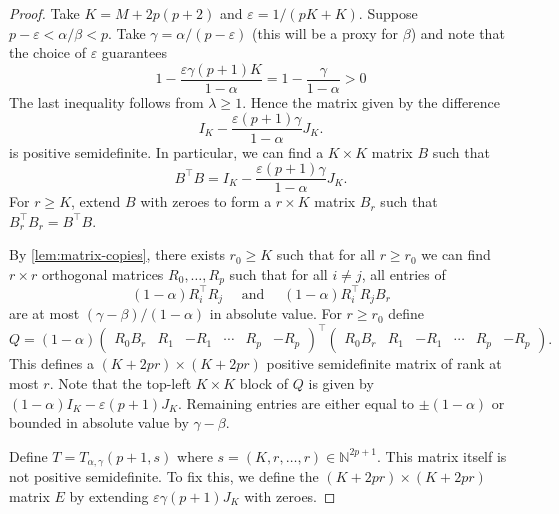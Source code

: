 \documentclass[reqno, 11pt]{amsart}
\theoremstyle{definition}
\theoremstyle{remark}
\newcommand{\NN}{\mathbb{N}}
\begin{document}
\begin{proof}
    Take $K = M + 2p(p+2)$ and $\varepsilon = 1/(pK + K)$. Suppose $p-\varepsilon < \alpha/\beta < p$. Take $\gamma = \alpha/(p-\varepsilon)$ (this will be a proxy for $\beta$) and note that the choice of $\varepsilon$ guarantees 
    \[
      1 - \frac{\varepsilon \gamma (p+1) K}{1-\alpha} = 1 - \frac{\gamma}{1-\alpha} > 0
    \]
    The last inequality follows from $\lambda \geq 1$. Hence the matrix given by the difference 
    \[
        I_{K}- \frac{\varepsilon (p+1) \gamma}{1-\alpha} J_{K}.
    \]
    is positive semidefinite. In particular, we can find a $K \times K$ matrix $B$ such that
    \[
        B^\intercal B = I_{K}- \frac{\varepsilon (p+1) \gamma}{1-\alpha} J_{K}.
    \]
    For $r \geq K$, extend $B$ with zeroes to form a $r \times K$ matrix $B_r$ such that $B_r^\intercal B_r = B^\intercal B$.
    
    By \cref{lem:matrix-copies}, there exists $r_0 \geq K$ such that for all $r \geq r_0$ we can find $r \times r$ orthogonal matrices $R_0, \ldots, R_{p}$ such that for all $i \neq j$, all entries of
    \[
        (1-\alpha)R_i^\intercal R_j \quad \text{ and } \quad (1-\alpha)R_i^\intercal R_jB_r
    \]
    are at most $(\gamma - \beta)/(1-\alpha)$ in absolute value. For $r \geq r_0$ define
    \[
    Q = (1-\alpha) \begin{pmatrix}
					 R_{0}B_r & R_1 & -R_1 & \cdots & R_p & -R_p
			      \end{pmatrix}^\intercal
                    \begin{pmatrix}
					R_{0}B_r & R_1 & -R_1 & \cdots & R_p & -R_p 
			      \end{pmatrix}.
    \]
This defines a $(K + 2pr) \times (K + 2pr)$ positive semidefinite matrix of rank at most $r$. Note that the top-left  $K \times K$ block of $Q$ is given by $ (1-\alpha)I_{K} - \varepsilon (p+1) J_{K}$. Remaining entries are either equal to $\pm(1-\alpha)$ or bounded in absolute value by $\gamma - \beta$.
    
Define $T = T_{\alpha, \gamma}(p+1, s)$ where $s = (K, r, \ldots, r) \in \NN^{2p+1}$. This matrix itself is not positive semidefinite. To fix this, we define the $(K + 2pr) \times (K + 2pr)$ matrix $E$ by extending $\varepsilon \gamma(p+1) J_{K}$ with zeroes.


\end{proof}
\end{document}
